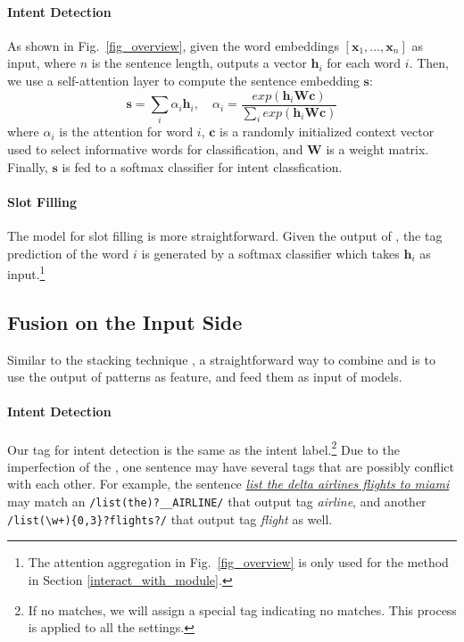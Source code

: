 \paragraph{Intent Detection}
As shown in Fig.~\ref{fig_overview}, given the word embeddings $[\textbf{x}_1, ..., \textbf{x}_n]$ as input, where $n$ is the sentence length, \BLSTM outputs a vector $\textbf{h}_i$ for each word $i$.
Then, we use a self-attention layer to compute the sentence embedding $\textbf{s}$:
\begin{equation}
\textbf{s} = \sum_{i}{\alpha_i\textbf{h}_i}, \quad \alpha_i=\frac{exp(\textbf{h}_i\textbf{Wc})}{\sum_{i}{exp(\textbf{h}_i\textbf{Wc})}}
\label{eq:simple_att}
\end{equation}
where  $\alpha_i$ is the attention for word $i$, $\textbf{c}$ is a randomly initialized context vector used to select informative words for classification, and $\textbf{W}$ is a weight matrix.
Finally, $\textbf{s}$ is fed to a softmax classifier for intent classfication.

\paragraph{Slot Filling}
The model for slot filling is more straightforward. Given the output of \BLSTM, the tag prediction of the word $i$ is generated by a
softmax classifier which takes $\textbf{h}_i$ as input.\footnote{The attention aggregation in Fig.~\ref{fig_overview} is only used for the
method in Section \ref{interact_with_module}.}


\subsection{Fusion on the Input Side}
\label{fusion_with_input}
Similar to the stacking technique \cite{wolpert1992stacked}, a straightforward way to combine \RE and \NN is to use the output of \RE patterns as feature, and feed them as input of \NN models.
\paragraph{Intent Detection}
Our \RE tag for intent detection is the same as the intent label.\footnote{If no \RE matches, we will assign a special tag indicating no matches. This process is applied to all the settings.}
Due to the imperfection of the \REs, one sentence may have several \RE tags that are possibly conflict with each other.
For example, the sentence \textsl{\underline{list the delta airlines flights to miami}} may match an \RE \texttt{/list(\;the)?\;\_\_AIRLINE/} that output tag \emph{airline},
and another \RE \texttt{/list(\;\textbackslash w+)\{0,3\}?\;flights?/} that output tag \emph{flight} as well.

